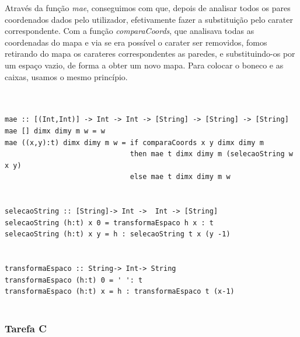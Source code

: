 \documentclass[a4paper]{article}
\begin{document}
Através da função \textit{mae}, conseguimos com que, depois de analisar todos os pares coordenados dados pelo utilizador, efetivamente fazer a substituição pelo carater correspondente. Com a função \textit{comparaCoords}, que analisava todas as coordenadas do mapa e via se era possível o carater ser removidos, fomos retirando do mapa os carateres correspondentes as paredes, e substituindo-os por um espaço vazio, de forma a obter um novo mapa. Para colocar o boneco e as caixas, usamos o mesmo princípio.


\begin{Verbatim}


mae :: [(Int,Int)] -> Int -> Int -> [String] -> [String] -> [String]
mae [] dimx dimy m w = w 
mae ((x,y):t) dimx dimy m w = if comparaCoords x y dimx dimy m 
                              then mae t dimx dimy m (selecaoString w x y) 
                              else mae t dimx dimy m w


selecaoString :: [String]-> Int ->  Int -> [String]
selecaoString (h:t) x 0 = transformaEspaco h x : t   
selecaoString (h:t) x y = h : selecaoString t x (y -1)


transformaEspaco :: String-> Int-> String
transformaEspaco (h:t) 0 = ' ': t   
transformaEspaco (h:t) x = h : transformaEspaco t (x-1)


\end{Verbatim}





\subsubsection{Tarefa C}
\end{document}
